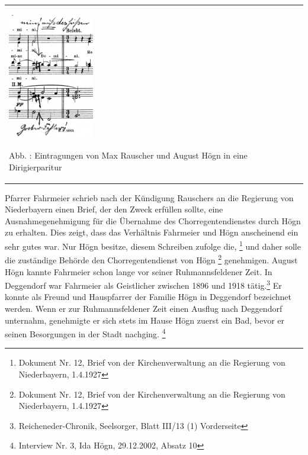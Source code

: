 \begin{center}
\begin{minipage}{4.142cm}
\begin{flushleft}
\tablefirsthead{}
\tablehead{}
\tabletail{}
\tablelasttail{}
\begin{supertabular}{m{3.9420002cm}}

\includegraphics[width=3.759cm,height=5.547cm]{pictures/zulassungsarbeit-img028.png}

\label{bkm:Ref100166968}Abb. : Eintragungen
von Max Rauscher und August Högn in eine Dirigierparitur\\
\end{supertabular}
\end{flushleft}
\end{minipage}
\end{center}
Pfarrer Fahrmeier schrieb nach der Kündigung Rauschers an die Regierung
von Niederbayern einen Brief, der den Zweck erfüllen sollte, eine
Ausnahmegenehmigung für die Übernahme des Chorregentendienstes durch
Högn zu erhalten. Dies zeigt, dass das Verhältnis Fahrmeier und Högn
anscheinend ein sehr gutes war. Nur Högn besitze, diesem Schreiben
zufolge die, \footnote{
Dokument Nr. 12, Brief von der Kirchenverwaltung an die Regierung von
Niederbayern, 1.4.1927} und daher solle die zuständige Behörde den
Chorregentendienst von Högn  \footnote{Dokument Nr. 12, Brief von der Kirchenverwaltung an die
Regierung von Niederbayern, 1.4.1927} genehmigen. August Högn kannte
Fahrmeier schon lange vor seiner Ruhmannsfeldener Zeit. In Deggendorf
war Fahrmeier als Geistlicher zwischen 1896 und 1918 tätig.\footnote{
Reicheneder-Chronik, Seelsorger, Blatt III/13
(1) Vorderseite} Er konnte als Freund und Hauspfarrer der Familie Högn
in Deggendorf bezeichnet werden. Wenn er zur Ruhmannsfeldener Zeit
einen Ausflug nach Deggendorf unternahm, genehmigte er sich stets im
Hause Högn zuerst ein Bad, bevor er seinen Besorgungen in der Stadt
nachging. \footnote{Interview Nr. 3, Ida Högn, 29.12.2002, Absatz 10}

